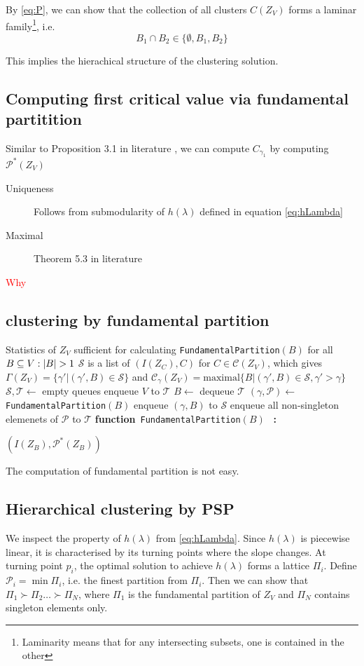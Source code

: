 \documentclass{article}
\makeatletter
\def\P{\mathcal{P}}
\DeclarePairedDelimiter\abs{\lvert}{\rvert}
\def\red#1{\textcolor{red}{#1}}
\newcommand{\algorithmicfunction}{\textbf{function}}
\newcommand{\algorithmicendfunction}{\algorithmicend\ \algorithmicfunction}
\newenvironment{ALC@func}{\begin{ALC@g}}{\end{ALC@g}}
\newcommand{\FUNCTION}[2][default]{\ALC@it\algorithmicfunction\ #2\ %
\textbf{:}%
\ALC@com{#1}\begin{ALC@func}}
\newcommand{\ENDFUNCTION}{\end{ALC@func}}
\newcommand{\ENDFUNCTION}{\end{ALC@func}\ALC@it\algorithmicendfunction}
\theoremstyle{definition}
\makeatother
\begin{document}
By \eqref{eq:P}, we can show that the collection of all clusters $C(Z_V)$ forms a laminar family\footnote{Laminarity means that for any intersecting subsets, one is contained in the other}, i.e.
\begin{equation}
B_1 \cap B_2 \in \{\emptyset, B_1, B_2\}
\end{equation}

This implies the hierachical structure of the clustering solution.
\subsection{Computing first critical value via fundamental partitition}
Similar to Proposition 3.1 in literature \cite{ic}, we can compute $C_{\gamma_1}$ by computing $\P^*(Z_V)$
\begin{description}
\item[Uniqueness] Follows from submodularity of  $h(\lambda)$ defined in equation \eqref{eq:hLambda}
\item[Maximal] Theorem 5.3 in literature \cite{ska}
\end{description}
\red{Why}

\subsection{clustering by fundamental partition}
\begin{algorithm}
\begin{algorithmic}[1]
\REQUIRE Statistics of $Z_V$ sufficient for calculating \texttt{FundamentalPartition}$(B)$ for all $B \subseteq V:\abs{B}>1$
\ENSURE $\mathcal{S}$ is a list of $(I(Z_C),C)$ for $ C \in \mathcal{C}(Z_V)$, which gives
$\Gamma(Z_V) = \{ \gamma' | (\gamma', B) \in \mathcal{S}\} $ and $ \mathcal{C}_{\gamma}(Z_V)
= \mathrm{maximal}\{B | (\gamma', B) \in \mathcal{S}, \gamma' > \gamma \}$
\STATE $\mathcal{S},\mathcal{T} \leftarrow$ empty queues
\STATE enqueue $V$ to $\mathcal{T}$
\STATE $B \leftarrow $ dequeue $\mathcal{T}$
\STATE $(\gamma, \P) \leftarrow$\texttt{FundamentalPartition}$(B)$
\STATE enqueue $(\gamma, B)$ to $\mathcal{S}$
\STATE enqueue all non-singleton elemenets of $\P$ to $\mathcal{T}$
\ENDWHILE
\FUNCTION{\texttt{FundamentalPartition}$(B)$}
  \RETURN $(I(Z_B), \P^*(Z_B))$
\ENDFUNCTION
\end{algorithmic}
\end{algorithm}

The computation of fundamental partition is not easy.
\subsection{Hierarchical clustering by PSP}
We inspect the property of $h(\lambda)$ from \eqref{eq:hLambda}. Since $h(\lambda)$ is piecewise linear, it is characterised by its turning points where the slope changes.
At turning point $p_i$, the optimal solution to achieve $h(\lambda)$ forms a lattice $\Pi_i$.
Define $\mathcal{P}_i = \min \Pi_i$, i.e. the finest partition from $\Pi_i$. Then we can show that
$\Pi_1 \succ \Pi_2 \dots \succ \Pi_N$, where $\Pi_1$ is the fundamental partition of $Z_V$ and $\Pi_N$ contains singleton elements only.
\end{document}
